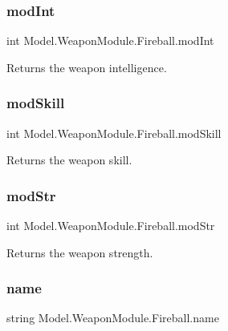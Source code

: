 \subsubsection{\texorpdfstring{mod\+Int}{modInt}}
{\footnotesize\ttfamily int Model.\+Weapon\+Module.\+Fireball.\+mod\+Int\hspace{0.3cm}{\ttfamily [get]}}

Returns the weapon intelligence. \hypertarget{class_model_1_1_weapon_module_1_1_fireball_a98cfe83a5eb848beb4565cebfe45e936}{}\label{class_model_1_1_weapon_module_1_1_fireball_a98cfe83a5eb848beb4565cebfe45e936} 
\subsubsection{\texorpdfstring{mod\+Skill}{modSkill}}
{\footnotesize\ttfamily int Model.\+Weapon\+Module.\+Fireball.\+mod\+Skill\hspace{0.3cm}{\ttfamily [get]}}

Returns the weapon skill. \hypertarget{class_model_1_1_weapon_module_1_1_fireball_a45f4f283e66024801ec7b96d4b743113}{}\label{class_model_1_1_weapon_module_1_1_fireball_a45f4f283e66024801ec7b96d4b743113} 
\subsubsection{\texorpdfstring{mod\+Str}{modStr}}
{\footnotesize\ttfamily int Model.\+Weapon\+Module.\+Fireball.\+mod\+Str\hspace{0.3cm}{\ttfamily [get]}}

Returns the weapon strength. \hypertarget{class_model_1_1_weapon_module_1_1_fireball_a9369ddc01ad4ef337914b316d5940283}{}\label{class_model_1_1_weapon_module_1_1_fireball_a9369ddc01ad4ef337914b316d5940283} 
\subsubsection{\texorpdfstring{name}{name}}
{\footnotesize\ttfamily string Model.\+Weapon\+Module.\+Fireball.\+name\hspace{0.3cm}{\ttfamily [get]}}

